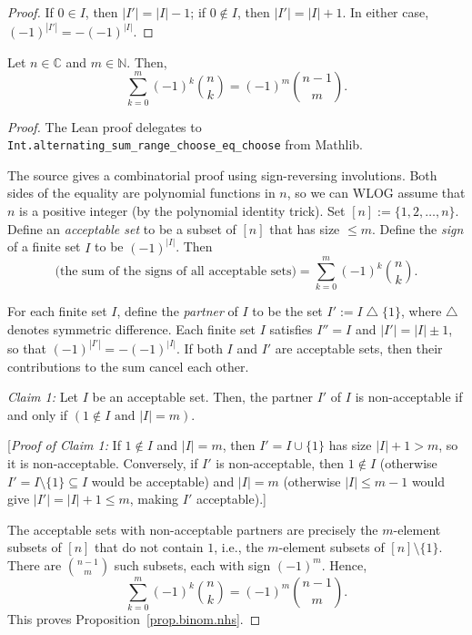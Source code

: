 \begin{proof}
\leanok
If $0 \in I$, then $|I'| = |I| - 1$; if $0 \notin I$, then
$|I'| = |I| + 1$. In either case,
$(-1)^{|I'|} = -(-1)^{|I|}$.
\end{proof}

\begin{proposition}
\label{prop.binom.nhs}
\leantarget
\leanok
Let $n\in\mathbb{C}$ and
$m\in\mathbb{N}$. Then,
\[
\sum_{k=0}^{m} (-1)^{k} \binom{n}{k}
= (-1)^{m} \binom{n-1}{m}.
\]
\end{proposition}

\begin{proof}
The Lean proof delegates to
\texttt{Int.alternating\_sum\_range\_choose\_eq\_choose} from Mathlib.

The source gives a combinatorial proof using sign-reversing involutions.
Both sides of the equality are polynomial functions in $n$, so we
can WLOG assume that $n$ is a positive integer (by the polynomial
identity trick). Set $[n] := \{1, 2, \ldots, n\}$.
Define an \emph{acceptable set} to be a subset of $[n]$ that has
size $\leq m$. Define the \emph{sign} of a finite set $I$ to be
$(-1)^{|I|}$. Then
\[
\bigl(\text{the sum of the signs of all acceptable sets}\bigr)
= \sum_{k=0}^{m} (-1)^k \binom{n}{k}.
\]

For each finite set $I$, define the \emph{partner} of $I$ to be the set
$I' := I \bigtriangleup \{1\}$,
where $\bigtriangleup$ denotes symmetric difference.
Each finite set $I$ satisfies $I'' = I$ and
$|I'| = |I| \pm 1$, so that
$(-1)^{|I'|} = -(-1)^{|I|}$. If both $I$ and $I'$ are acceptable
sets, then their contributions to the sum cancel each other.

\textit{Claim 1:} Let $I$ be an acceptable set. Then, the partner
$I'$ of $I$ is non-acceptable if and only if
$(1 \notin I \text{ and } |I| = m)$.

[\textit{Proof of Claim 1:} If $1 \notin I$ and $|I| = m$, then
$I' = I \cup \{1\}$ has size $|I| + 1 > m$, so it is non-acceptable.
Conversely, if $I'$ is non-acceptable, then $1 \notin I$ (otherwise
$I' = I \setminus \{1\} \subseteq I$ would be acceptable) and
$|I| = m$ (otherwise $|I| \leq m - 1$ would give
$|I'| = |I| + 1 \leq m$, making $I'$ acceptable).]

The acceptable sets with non-acceptable partners are precisely the
$m$-element subsets of $[n]$ that do not contain $1$, i.e., the
$m$-element subsets of $[n] \setminus \{1\}$. There are
$\binom{n-1}{m}$ such subsets, each with sign $(-1)^m$.
Hence,
\[
\sum_{k=0}^{m} (-1)^{k} \binom{n}{k} = (-1)^{m} \binom{n-1}{m}.
\]
This proves Proposition~\ref{prop.binom.nhs}.
\end{proof}

